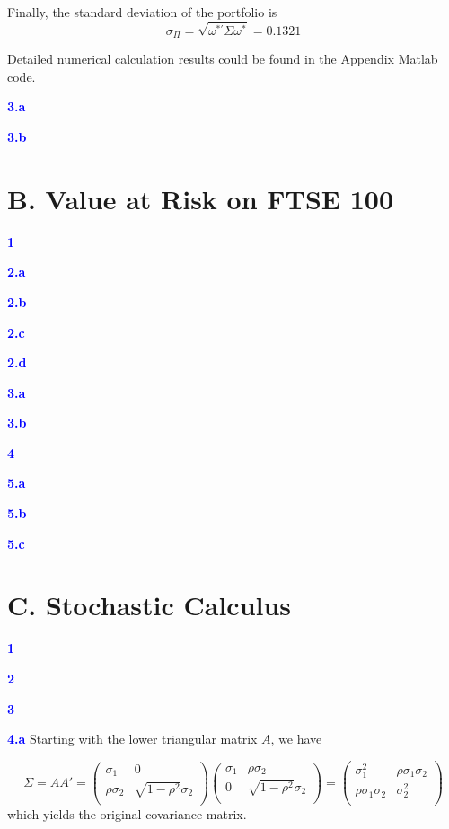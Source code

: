 \documentclass[a4paper,11pt] {article}
\begin{document}
Finally, the standard deviation of the portfolio is
$$
\sigma_{\Pi} = \sqrt{\omega^{*'}\Sigma\omega^*} = 0.1321
$$

Detailed numerical calculation results could be found in the Appendix Matlab code.

\textcolor{blue}{\bf 3.a }

\textcolor{blue}{\bf 3.b }

\section*{B. Value at Risk on FTSE 100}
\textcolor{blue}{\bf 1 }

\textcolor{blue}{\bf 2.a }

\textcolor{blue}{\bf 2.b }

\textcolor{blue}{\bf 2.c }

\textcolor{blue}{\bf 2.d }

\textcolor{blue}{\bf 3.a }

\textcolor{blue}{\bf 3.b }

\textcolor{blue}{\bf 4 }

\textcolor{blue}{\bf 5.a }

\textcolor{blue}{\bf 5.b }

\textcolor{blue}{\bf 5.c }

\section*{C. Stochastic Calculus}
\textcolor{blue}{\bf 1 }

\textcolor{blue}{\bf 2}

\textcolor{blue}{\bf 3 }

\textcolor{blue}{\bf 4.a } Starting with the lower triangular matrix $A$, we have

$$
\Sigma = AA' =
\left(
  \begin{array}{cc}
    \sigma_1 & 0 \\
    \rho \sigma_2 & \sqrt{1-\rho^2}\sigma_2 \\
  \end{array}
\right)
\left(
  \begin{array}{cc}
    \sigma_1 & \rho \sigma_2 \\
    0 & \sqrt{1-\rho^2}\sigma_2 \\
  \end{array}
\right)
=
\left(
  \begin{array}{cc}
    \sigma_1^2 & \rho \sigma_1 \sigma_2 \\
    \rho \sigma_1 \sigma_2 & \sigma_2^2 \\
  \end{array}
\right)
$$
which yields the original covariance matrix.
\end{document}
